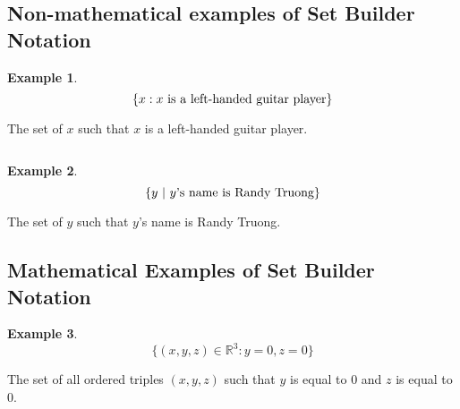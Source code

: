 \documentclass{report}
\newcommand{\R}{\mathbb{R}}
\begin{document}
\begin{sloppypar}
\begin{center}
\end{center}

\begin{center}

\end{center}

\subsection{Non-mathematical examples of Set Builder Notation}

\newtheorem*{remark*}{Example}
\begin{remark*}
  \[ \{ x : \textrm{$ x $ is a left-handed guitar player} \}\]
\end{remark*}
\begin{definition*}
  The set of $ x $ such that $ x $ is a left-handed guitar
  player.
\end{definition*}
\[ \]
\begin{remark*}
  \[ \{ y ~|~ \textrm{$ y $'s name is Randy Truong} \}\]
\end{remark*}

\begin{definition*}
  The set of $ y $ such that $ y $'s name is Randy Truong.
\end{definition*}

\subsection{Mathematical Examples of Set Builder Notation}
\begin{remark*}
  \[ \{ (x, y, z) \in \R^{3} : y=0, z=0 \}\]
\end{remark*}
\begin{definition*}
  The set of all ordered triples $ (x, y, z)$ such that
  $ y $ is equal to $ 0 $ and $ z $ is equal to $ 0 $.
\end{definition*}


\end{sloppypar}
\end{document}
